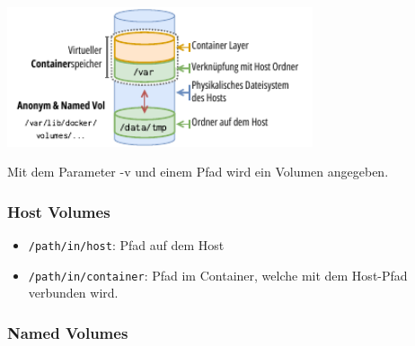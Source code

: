 \documentclass[
  10pt,
  a4paper,
]{article}
\newenvironment{Shaded}{}{}
\newcommand{\AttributeTok}[1]{\textcolor[rgb]{0.84,0.23,0.29}{#1}}
\newcommand{\ExtensionTok}[1]{\textcolor[rgb]{0.84,0.23,0.29}{\textbf{#1}}}
\newcommand{\NormalTok}[1]{\textcolor[rgb]{0.14,0.16,0.18}{#1}}
\newcommand{\OperatorTok}[1]{\textcolor[rgb]{0.14,0.16,0.18}{#1}}
\providecommand{\tightlist}{%
  \setlength{\itemsep}{0pt}\setlength{\parskip}{0pt}}\usepackage{longtable,booktabs,array}
\begin{document}
\begin{multicols*}{2}
\begin{center}
\includegraphics[width=9cm,height=\textheight]{images/docker/volume_structure.pdf}
\end{center}

Mit dem Parameter \AttributeTok{{-}v} und einem Pfad wird ein Volumen
angegeben.

\subsubsection{Host Volumes}\label{host-volumes}

\begin{Shaded}
\end{Shaded}

\begin{itemize}
\tightlist
\item
  \texttt{/path/in/host}: Pfad auf dem Host
\item
  \texttt{/path/in/container}: Pfad im Container, welche mit dem
  Host-Pfad verbunden wird.
\end{itemize}

\subsubsection{Named Volumes}\label{named-volumes}

\begin{Shaded}
\end{Shaded}


\end{multicols*}
\end{document}
